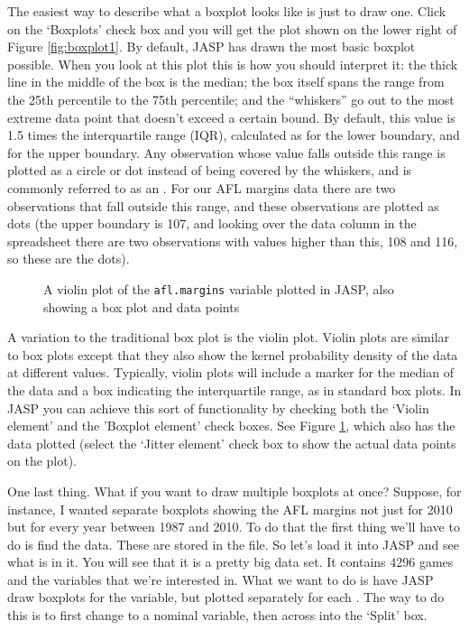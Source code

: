 The easiest way to describe what a boxplot looks like is just to draw one. Click on the `Boxplots' check box and you will get the plot shown on the lower right of Figure \ref{fig:boxplot1}. By default, JASP has drawn the most basic boxplot possible. When you look at this plot this is how you should interpret it: the thick line in the middle of the box is the median; the box itself spans the range from the 25th percentile to the 75th percentile; and the ``whiskers'' go out to the most extreme data point that doesn't exceed a certain bound. By default, this value is 1.5 times the interquartile range (IQR), calculated as  for the lower boundary, and  for the upper boundary. Any observation whose value falls outside this range is plotted as a circle or dot instead of being covered by the whiskers, and is commonly referred to as an . For our AFL margins data there are two observations that fall outside this range, and these observations are plotted as dots (the upper boundary is 107, and looking over the data column in the spreadsheet there are two observations with values higher than this, 108 and 116, so these are the dots). 


\begin{figure}[!!htb]
\begin{center}
\caption{A violin plot of the \texttt{afl.margins} variable plotted in JASP, also showing a box plot and data points}
\label{fig:boxplot2}
\HR
\end{center}
\end{figure}

A variation to the traditional box plot is the violin plot. Violin plots are similar to box plots except that they also show the kernel probability density of the data at different values. Typically, violin plots will include a marker for the median of the data and a box indicating the interquartile range, as in standard box plots. In JASP you can achieve this sort of functionality by checking both the `Violin element' and the 'Boxplot element' check boxes. See Figure \ref{fig:boxplot2}, which also has the data plotted (select the `Jitter element' check box to show the actual data points on the plot). 


One last thing. What if you want to draw multiple boxplots at once? Suppose, for instance, I wanted separate boxplots showing the AFL margins not just for 2010 but for every year between 1987 and 2010. To do that the first thing we'll have to do is find the data. These are stored in the  file. So let's load it into JASP and see what is in it. You will see that it is a pretty big data set. It contains 4296 games and the variables that we're interested in. What we want to do is have JASP draw boxplots for the  variable, but plotted separately for each  . The way to do this is to first change  to a nominal variable, then  across into the `Split' box.

